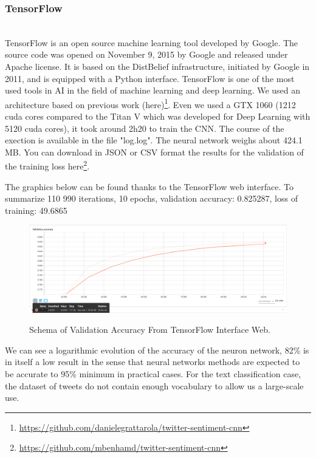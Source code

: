 \documentclass{acmtog} %
\begin{document}
\subsubsection{TensorFlow}
\label{subsub:dl}

~\\TensorFlow is an open source machine learning tool developed by Google. The source code was opened on November 9, 2015 by Google and released under Apache license.
It is based on the DistBelief infrastructure, initiated by Google in 2011, and is equipped with a Python interface.
TensorFlow is one of the most used tools in AI in the field of machine learning and deep learning.
We used an architecture based on previous work (here)\footnote{\url{https://github.com/danielegrattarola/twitter-sentiment-cnn}}.
Even we used a GTX 1060 (1212 cuda cores compared to the Titan V which was developed for Deep Learning with 5120 cuda cores), it took around 2h20 to train the CNN.
The course of the exection is available in the file "log.log".
The neural network weighs about 424.1 MB.
You can download in JSON or CSV format the results for the validation of the training loss here\footnote{\url{https://github.com/mbenhamd/twitter-sentiment-cnn}}.

The graphics below can be found thanks to the TensorFlow web interface.
To summarize 110 990 iterations, 10 epochs, validation accuracy: 0.825287, loss of training: 49.6865

\begin{figure}[H]
{\includegraphics[width=\linewidth]{validation-accuracy.png}}
\caption{Schema of Validation Accuracy From TensorFlow Interface Web.}
  \label{fig:archivedb}
\end{figure}

We can see a logarithmic evolution of the accuracy of the neuron network, 82\% is in itself a low result in the sense that neural networks methods are expected to be accurate to 95\% minimum in practical cases. For the text classification case, the dataset of tweets do not contain enough vocabulary to allow us a large-scale use.
\end{document}
